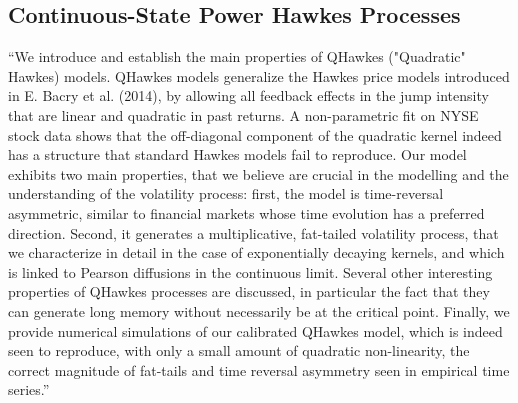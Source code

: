 \documentclass[honours,12pt]{unswthesis}
\numberwithin{equation}{section}
\begin{document}
\subsection{Continuous-State Power Hawkes Processes}
``We introduce and establish the main properties of QHawkes ("Quadratic" Hawkes) models. QHawkes models generalize the Hawkes price models introduced in E. Bacry et al. (2014), by allowing all feedback effects in the jump intensity that are linear and quadratic in past returns. A non-parametric fit on NYSE stock data shows that the off-diagonal component of the quadratic kernel indeed has a structure that standard Hawkes models fail to reproduce. Our model exhibits two main properties, that we believe are crucial in the modelling and the understanding of the volatility process: first, the model is time-reversal asymmetric, similar to financial markets whose time evolution has a preferred direction. Second, it generates a multiplicative, fat-tailed volatility process, that we characterize in detail in the case of exponentially decaying kernels, and which is linked to Pearson diffusions in the continuous limit. Several other interesting properties of QHawkes processes are discussed, in particular the fact that they can generate long memory without necessarily be at the critical point. Finally, we provide numerical simulations of our calibrated QHawkes model, which is indeed seen to reproduce, with only a small amount of quadratic non-linearity, the correct magnitude of fat-tails and time reversal asymmetry seen in empirical time series.''
\end{document}
